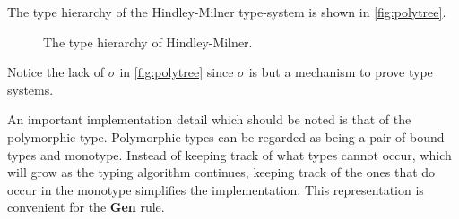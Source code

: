 \documentclass[11pt,oneside,a4paper]{report}
\begin{document}
The type hierarchy of the Hindley-Milner type-system is shown in \autoref{fig:polytree}.
\begin{figure}[ht]
    \centering
    \caption{The type hierarchy of Hindley-Milner.}
    \label{fig:polytree}
\end{figure}
Notice the lack of $\sigma$ in \autoref{fig:polytree} since $\sigma$ is but a mechanism to prove type systems.
\begin{remark}
    \label{remark:polyimpl}
An important implementation detail which should be noted is that of the polymorphic type.
Polymorphic types can be regarded as being a pair of bound types and monotype.
Instead of keeping track of what types cannot occur, which will grow as the typing algorithm continues, keeping track of the ones that do occur in the monotype simplifies the implementation.
This representation is convenient for the \textbf{Gen} rule.
\end{remark}
\end{document}
